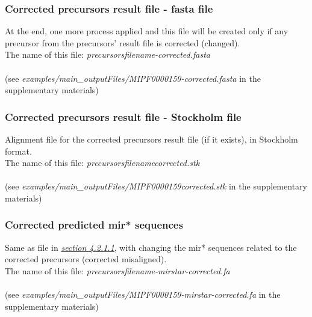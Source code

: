\documentclass[a4paper,20pt]{report}
\begin{document}
\subsubsection{Corrected precursors result file - fasta file}
\label{sec:corrfile}
\noindent
At the end, one more process applied and this file will be created only if any precursor from the precursors' result file 
is corrected (changed).\\
The name of this file: \textit{precursorsfilename-corrected.fasta}\\\\  
(see \textit{examples/main\_outputFiles/MIPF0000159-corrected.fasta} in the supplementary materials)

\subsubsection{Corrected precursors result file - Stockholm file}
\noindent
Alignment file for the corrected precursors result file (if it exists), in Stockholm format.\\
The name of this file: \textit{precursorsfilenamecorrected.stk}\\\\
(see \textit{examples/main\_outputFiles/MIPF0000159corrected.stk} in the supplementary materials)

\subsubsection{Corrected predicted mir* sequences}
Same as file in \hyperref[sec:mirspred]{\textit{section 4.2.1.1}}, with changing the mir* sequences 
related to the corrected precursors (corrected misaligned).\\
The name of this file: \textit{precursorsfilename-mirstar-corrected.fa}\\\\
(see \textit{examples/main\_outputFiles/MIPF0000159-mirstar-corrected.fa} in the supplementary materials)
\end{document}
